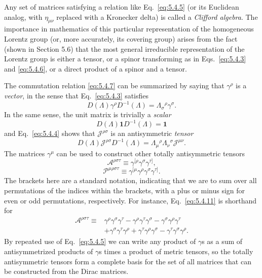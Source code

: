 Any set of matrices satisfying a relation like Eq.~\eqref{eq:5.4.5} (or its Euclidean
analog, with $\eta_{\mu\nu}$ replaced with a Kronecker delta) is called a
\emph{Clifford algebra}. The importance in mathematics of this particular
representation of the homogeneous Lorentz group (or, more accurately, its
covering group) arises from the fact (shown in Section 5.6) that the most
general irreducible representation of the Lorentz group is either a tensor, or
a spinor transforming as in Eqs.~\eqref{eq:5.4.3} and \eqref{eq:5.4.6}, or a direct product of a
spinor and a tensor.

The commutation relation \eqref{eq:5.4.7} can be summarized by saying that $\gamma^\rho$
is a \emph{vector}, in the sense that Eq.~\eqref{eq:5.4.3} satisfies
\begin{equation}
D(\Lambda)\gamma^\rho D^{-1}(\Lambda)=\Lambda_\sigma{}^\rho\gamma^\sigma.
\tag{5.4.8}\label{eq:5.4.8}
\end{equation}
In the same sense, the unit matrix is trivially a \emph{scalar}
\begin{equation}
D(\Lambda)\mathbf{1}D^{-1}(\Lambda)=\mathbf{1}
\tag{5.4.9}\label{eq:5.4.9}
\end{equation}
and Eq.~\eqref{eq:5.4.4} shows that $\mathcal{J}^{\rho\sigma}$ is an antisymmetric
\emph{tensor}
\begin{equation}
D(\Lambda)\mathcal{J}^{\rho\sigma}D^{-1}(\Lambda)
=\Lambda_\mu{}^\rho\Lambda_\nu{}^\sigma\mathcal{J}^{\mu\nu}.
\tag{5.4.10}\label{eq:5.4.10}
\end{equation}
The matrices $\gamma^\mu$ can be used to construct other totally
antisymmetric tensors
\begin{equation}
\mathcal{A}^{\rho\sigma\tau}\equiv\gamma^{[\rho}\gamma^\sigma\gamma^{\tau]},
\tag{5.4.11}\label{eq:5.4.11}
\end{equation}
\begin{equation}
\mathcal{P}^{\mu\rho\sigma\tau}\equiv
\gamma^{[\mu}\gamma^\rho\gamma^\sigma\gamma^{\tau]}.
\tag{5.4.12}\label{eq:5.4.12}
\end{equation}
The brackets here are a standard notation, indicating that we are to sum over
all permutations of the indices within the brackets, with a plus or minus sign
for even or odd permutations, respectively. For instance, Eq.~\eqref{eq:5.4.11} is
shorthand for
\begin{align*}
\mathcal{A}^{\rho\sigma\tau}\equiv{}&
\gamma^\rho\gamma^\sigma\gamma^\tau
-\gamma^\rho\gamma^\tau\gamma^\sigma
-\gamma^\sigma\gamma^\rho\gamma^\tau\\
&+\gamma^\sigma\gamma^\tau\gamma^\rho
+\gamma^\tau\gamma^\rho\gamma^\sigma
-\gamma^\tau\gamma^\sigma\gamma^\rho.
\end{align*}
By repeated use of Eq.~\eqref{eq:5.4.5} we can write any product of $\gamma$s as a sum
of antisymmetrized products of $\gamma$s times a product of metric tensors, so
the totally antisymmetric tensors form a complete basis for the set of all
matrices that can be constructed from the Dirac matrices.


